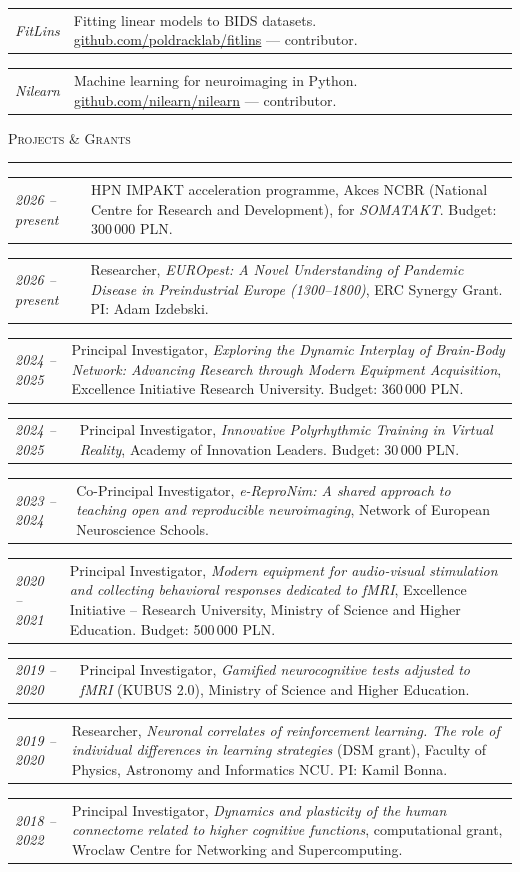 \documentclass[10pt, a4paper]{article}
\makeatletter
\newcommand{\cvsection}[1]{%
  \vspace{1.4em}%
  {\large\scshape #1}%
  \vspace{0.25em}%
  \par\noindent\textcolor{rule}{\rule{\linewidth}{0.4pt}}%
  \vspace{0.5em}%
}
\newcommand{\cventry}[2]{%
  \begin{tabular*}{\linewidth}{@{}p{2.8cm}@{\hspace{0.5em}}p{\dimexpr\linewidth-3.3cm}@{}}
    \textcolor{accent}{\small\itshape #1} & #2 \\[0.2em]
  \end{tabular*}%
}
\makeatother
\begin{document}
\cventry{FitLins}{Fitting linear models to BIDS datasets. \href{https://github.com/poldracklab/fitlins}{github.com/poldracklab/fitlins} — contributor.}

\cventry{Nilearn}{Machine learning for neuroimaging in Python. \href{https://github.com/nilearn/nilearn}{github.com/nilearn/nilearn} — contributor.}

\cvsection{Projects \& Grants}

\cventry{2026 -- present}{HPN IMPAKT acceleration programme, Akces NCBR (National Centre for Research and Development), for \textit{SOMATAKT}. Budget: 300\,000 PLN.}

\cventry{2026 -- present}{Researcher, \textit{EUROpest: A Novel Understanding of Pandemic Disease in Preindustrial Europe (1300--1800)}, ERC Synergy Grant. PI: Adam Izdebski.}

\cventry{2024 -- 2025}{Principal Investigator, \textit{Exploring the Dynamic Interplay of Brain-Body Network: Advancing Research through Modern Equipment Acquisition}, Excellence Initiative Research University. Budget: 360\,000 PLN.}

\cventry{2024 -- 2025}{Principal Investigator, \textit{Innovative Polyrhythmic Training in Virtual Reality}, Academy of Innovation Leaders. Budget: 30\,000 PLN.}

\cventry{2023 -- 2024}{Co-Principal Investigator, \textit{e-ReproNim: A shared approach to teaching open and reproducible neuroimaging}, Network of European Neuroscience Schools.}

\cventry{2020 -- 2021}{Principal Investigator, \textit{Modern equipment for audio-visual stimulation and collecting behavioral responses dedicated to fMRI}, Excellence Initiative -- Research University, Ministry of Science and Higher Education. Budget: 500\,000 PLN.}

\cventry{2019 -- 2020}{Principal Investigator, \textit{Gamified neurocognitive tests adjusted to fMRI} (KUBUS 2.0), Ministry of Science and Higher Education.}

\cventry{2019 -- 2020}{Researcher, \textit{Neuronal correlates of reinforcement learning. The role of individual differences in learning strategies} (DSM grant), Faculty of Physics, Astronomy and Informatics NCU. PI: Kamil Bonna.}

\cventry{2018 -- 2022}{Principal Investigator, \textit{Dynamics and plasticity of the human connectome related to higher cognitive functions}, computational grant, Wroclaw Centre for Networking and Supercomputing.}
\end{document}
